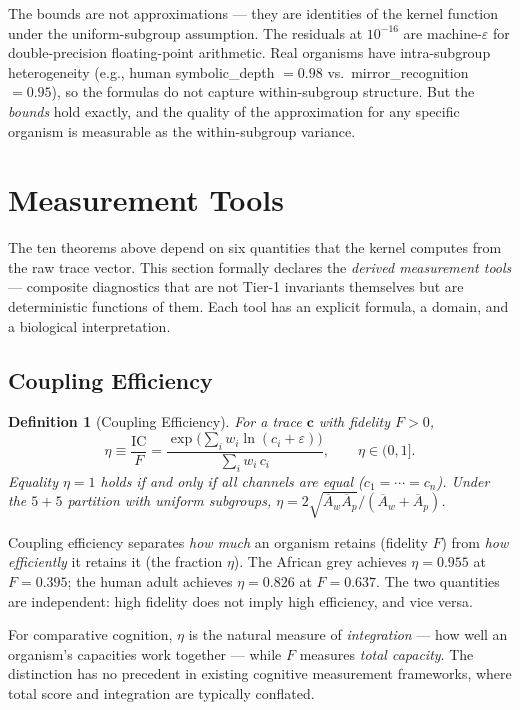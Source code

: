 \documentclass[
  aps,
  prd,
  twocolumn,
  superscriptaddress,
  nofootinbib,
  floatfix
]{revtex4-2}
\newtheorem{definition}[theorem]{Definition}
\newcommand{\eps}{\varepsilon}
\newcommand{\beq}{\begin{equation}}
\newcommand{\eeq}{\end{equation}}
\newcommand{\tvec}{\mathbf{c}}
\newcommand{\IC}{\mathrm{IC}}
\newcommand{\Aw}{\overline{A}_{\!w}}
\newcommand{\Ap}{\overline{A}_{\!p}}
\begin{document}
The bounds are not approximations --- they are identities
of the kernel function under the uniform-subgroup assumption.
The residuals at $10^{-16}$ are machine-$\eps$ for
double-precision floating-point arithmetic.  Real organisms
have intra-subgroup heterogeneity (e.g., human symbolic\_depth
$= 0.98$ vs.\ mirror\_recognition $= 0.95$), so the formulas
do not capture within-subgroup structure.  But the
\emph{bounds} hold exactly, and the quality of the
approximation for any specific organism is measurable as
the within-subgroup variance.

\section{Measurement Tools}\label{sec:tools}

The ten theorems above depend on six quantities that
the kernel computes from the raw trace vector.  This
section formally declares the \emph{derived measurement
tools} --- composite diagnostics that are not Tier-1
invariants themselves but are deterministic functions of
them.  Each tool has an explicit formula, a domain, and
a biological interpretation.

\subsection{Coupling Efficiency}

\begin{definition}[Coupling Efficiency]\label{def:eta}
For a trace $\tvec$ with fidelity $F > 0$,
\beq\label{eq:eta}
  \eta \equiv \frac{\IC}{F}
    = \frac{\exp\!\bigl(\sum_i w_i\ln(c_i+\eps)\bigr)}
           {\sum_i w_i\, c_i},
  \qquad \eta \in (0, 1].
\eeq
Equality $\eta = 1$ holds if and only if all channels
are equal ($c_1 = \cdots = c_n$).  Under the $5\!+\!5$
partition with uniform subgroups,
$\eta = 2\sqrt{\Aw\Ap}/(\Aw + \Ap)$.
\end{definition}

Coupling efficiency separates \emph{how much} an organism
retains (fidelity $F$) from \emph{how efficiently} it retains
it (the fraction $\eta$).  The African grey achieves
$\eta = 0.955$ at $F = 0.395$; the human adult achieves
$\eta = 0.826$ at $F = 0.637$.  The two quantities are
independent: high fidelity does not imply high efficiency,
and vice versa.

For comparative cognition, $\eta$ is the natural measure of
\emph{integration} --- how well an organism's capacities
work together --- while $F$ measures \emph{total capacity}.
The distinction has no precedent in existing cognitive
measurement frameworks, where total score and integration
are typically conflated.
\end{document}
